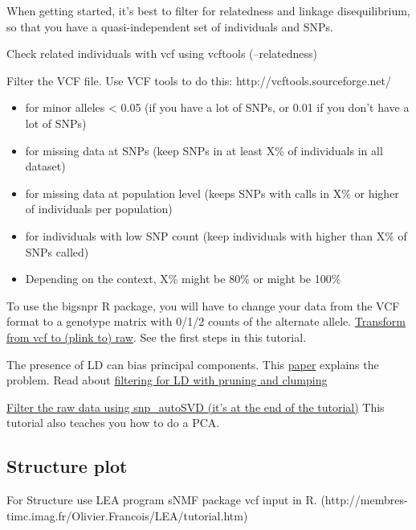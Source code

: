 \documentclass[
  letterpaper,
  DIV=11,
  numbers=noendperiod]{scrreprt}
\begin{document}
When getting started, it's best to filter for relatedness and linkage
disequilibrium, so that you have a quasi-independent set of individuals
and SNPs.

Check related individuals with vcf using vcftools (--relatedness)

Filter the VCF file. Use VCF tools to do this:
http://vcftools.sourceforge.net/

\begin{itemize}
\item
  for minor alleles \textless{} 0.05 (if you have a lot of SNPs, or 0.01
  if you don't have a lot of SNPs)
\item
  for missing data at SNPs (keep SNPs in at least X\% of individuals in
  all dataset)
\item
  for missing data at population level (keeps SNPs with calls in X\% or
  higher of individuals per population)
\item
  for individuals with low SNP count (keep individuals with higher than
  X\% of SNPs called)
\item
  Depending on the context, X\% might be 80\% or might be 100\%
\end{itemize}

To use the bigsnpr R package, you will have to change your data from the
VCF format to a genotype matrix with 0/1/2 counts of the alternate
allele. \href{https://github.com/laurabenestan/RDA_outlier}{Transform
from vcf to (plink to) raw}. See the first steps in this tutorial.

The presence of LD can bias principal components. This
\href{https://academic.oup.com/bioinformatics/article/36/16/4449/5838185?login=true}{paper}
explains the problem. Read about
\href{https://privefl.github.io/bigsnpr/articles/pruning-vs-clumping.html}{filtering
for LD with pruning and clumping}

\href{https://privefl.github.io/bigsnpr/articles/how-to-PCA.html}{Filter
the raw data using snp\_autoSVD (it's at the end of the tutorial)} This
tutorial also teaches you how to do a PCA.

\hypertarget{structure-plot}{%
\subsection*{\texorpdfstring{\textbf{Structure
plot}}{Structure plot}}\label{structure-plot}}

For Structure use LEA program sNMF package vcf input in R.
(http://membres-timc.imag.fr/Olivier.Francois/LEA/tutorial.htm)
\end{document}
